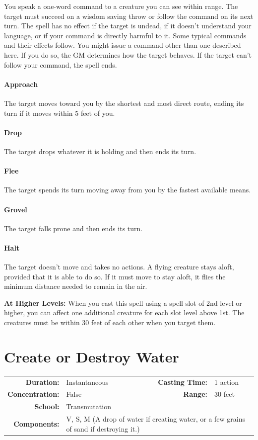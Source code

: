 \documentclass[12pt,showtrims]{memoir}
\begin{document}
\vspace{1\baselineskip}\noindent You speak a one-word command to a creature you can see within range. The target must succeed on a wisdom saving throw or follow the command on its next turn. The spell has no effect if the target is undead, if it doesn't understand your language, or if your command is directly harmful to it. Some typical commands and their effects follow. You might issue a command other than one described here. If you do so, the GM determines how the target behaves. If the target can't follow your command, the spell ends. \paragraph{Approach} The target moves toward you by the shortest and most direct route, ending its turn if it moves within 5 feet of you. \paragraph{Drop} The target drops whatever it is holding and then ends its turn. \paragraph{Flee} The target spends its turn moving away from you by the fastest available means. \paragraph{Grovel} The target falls prone and then ends its turn. \paragraph{Halt} The target doesn't move and takes no actions. A flying creature stays aloft, provided that it is able to do so. If it must move to stay aloft, it flies the minimum distance needed to remain in the air.

\vspace{8pt} \noindent\textbf{At Higher Levels:} When you cast this spell using a spell slot of 2nd level or higher, you can affect one additional creature for each slot level above 1st. The creatures must be within 30 feet of each other when you target them.
\newpage
\section*{Create or Destroy Water}

{
\small\centering\vspace{-6pt}
\begin{tabular}{rlrl}
\toprule

\textbf{Duration:} & Instantaneous &
\textbf{Casting Time:} & 1 action \\
\textbf{Concentration:} & False &
\textbf{Range:} & 30 feet \\
\textbf{School:} & Transmutation \\
\textbf{Components:} & \multicolumn{3}{p{0.7\textwidth}}{V, S, M (A drop of water if creating water, or a few grains of sand if destroying it.)}\\

\bottomrule
\end{tabular}
}
\end{document}
